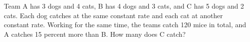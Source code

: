 Team A has 3 dogs and 4 cats, B has 4 dogs and 3 cats, and C has 5 dogs and 2 cats. Each dog catches at the same constant rate and each cat at another constant rate. Working for the same time, the teams catch 120 mice in total, and A catches 15 percent more than B. How many does C catch?
